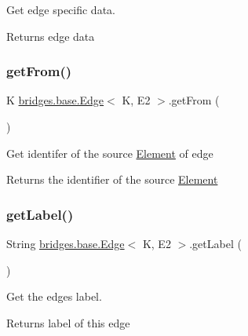 Get edge specific data.

\begin{DoxyReturn}{Returns}
edge data 
\end{DoxyReturn}
\mbox{\label{classbridges_1_1base_1_1_edge_afc23a7c2ee8ab4c4f0950c9bf25edd56}} 
\subsubsection{\texorpdfstring{getFrom()}{getFrom()}}
{\footnotesize\ttfamily K \mbox{\hyperlink{classbridges_1_1base_1_1_edge}{bridges.\+base.\+Edge}}$<$ K, E2 $>$.get\+From (\begin{DoxyParamCaption}{ }\end{DoxyParamCaption})}

Get identifer of the source \mbox{\hyperlink{classbridges_1_1base_1_1_element}{Element}} of edge

\begin{DoxyReturn}{Returns}
the identifier of the source \mbox{\hyperlink{classbridges_1_1base_1_1_element}{Element}} 
\end{DoxyReturn}
\mbox{\label{classbridges_1_1base_1_1_edge_a8663708d930e8df460c57d8bdbab44b2}} 
\subsubsection{\texorpdfstring{getLabel()}{getLabel()}}
{\footnotesize\ttfamily String \mbox{\hyperlink{classbridges_1_1base_1_1_edge}{bridges.\+base.\+Edge}}$<$ K, E2 $>$.get\+Label (\begin{DoxyParamCaption}{ }\end{DoxyParamCaption})}



Get the edge\textquotesingle{}s label. 

\begin{DoxyReturn}{Returns}
label of this edge 
\end{DoxyReturn}
\mbox{\label{classbridges_1_1base_1_1_edge_a11c655622b8a54f2931f59b1d256f84a}} 
